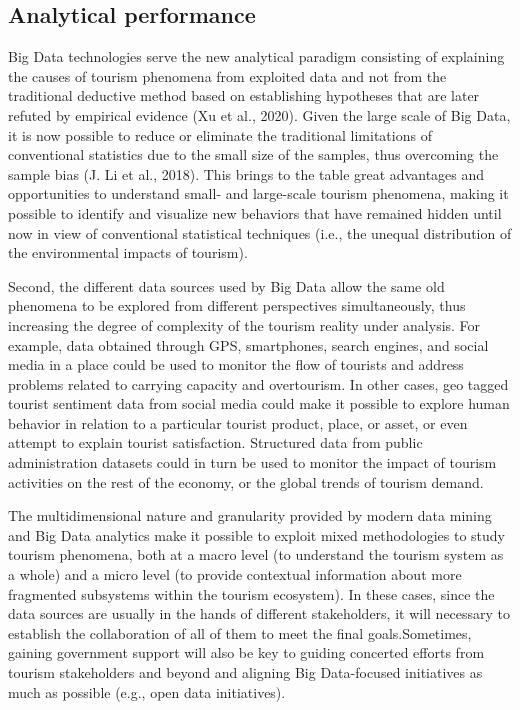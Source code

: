 \documentclass[
  letterpaper,
  DIV=11,
  numbers=noendperiod]{scrreprt}
\begin{document}
\hypertarget{analytical-performance}{%
\subsection{Analytical performance}\label{analytical-performance}}

Big Data technologies serve the new analytical paradigm consisting of
explaining the causes of tourism phenomena from exploited data and not
from the traditional deductive method based on establishing hypotheses
that are later refuted by empirical evidence (Xu et al., 2020). Given
the large scale of Big Data, it is now possible to reduce or eliminate
the traditional limitations of conventional statistics due to the small
size of the samples, thus overcoming the sample bias (J. Li et al.,
2018). This brings to the table great advantages and opportunities to
understand small- and large-scale tourism phenomena, making it possible
to identify and visualize new behaviors that have remained hidden until
now in view of conventional statistical techniques (i.e., the unequal
distribution of the environmental impacts of tourism).

Second, the different data sources used by Big Data allow the same old
phenomena to be explored from different perspectives simultaneously,
thus increasing the degree of complexity of the tourism reality under
analysis. For example, data obtained through GPS, smartphones, search
engines, and social media in a place could be used to monitor the flow
of tourists and address problems related to carrying capacity and
overtourism. In other cases, geo tagged tourist sentiment data from
social media could make it possible to explore human behavior in
relation to a particular tourist product, place, or asset, or even
attempt to explain tourist satisfaction. Structured data from public
administration datasets could in turn be used to monitor the impact of
tourism activities on the rest of the economy, or the global trends of
tourism demand.

The multidimensional nature and granularity provided by modern data
mining and Big Data analytics make it possible to exploit mixed
methodologies to study tourism phenomena, both at a macro level (to
understand the tourism system as a whole) and a micro level (to provide
contextual information about more fragmented subsystems within the
tourism ecosystem). In these cases, since the data sources are usually
in the hands of different stakeholders, it will necessary to establish
the collaboration of all of them to meet the final goals.Sometimes,
gaining government support will also be key to guiding concerted efforts
from tourism stakeholders and beyond and aligning Big Data-focused
initiatives as much as possible (e.g., open data initiatives).
\end{document}
